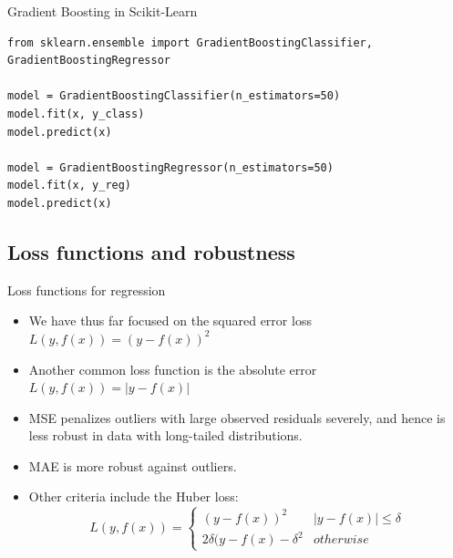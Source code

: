 \documentclass[aspectratio=169]{beamer}
\begin{document}
\begin{frame}[fragile]{Gradient Boosting in Scikit-Learn}
\begin{verbatim}
from sklearn.ensemble import GradientBoostingClassifier, GradientBoostingRegressor

model = GradientBoostingClassifier(n_estimators=50)
model.fit(x, y_class)
model.predict(x)

model = GradientBoostingRegressor(n_estimators=50)
model.fit(x, y_reg)
model.predict(x)

\end{verbatim}
\end{frame}


\subsection{Loss functions and robustness}


\begin{frame}{Loss functions for regression}
    \begin{itemize}
        \item We have thus far focused on the squared error loss $L(y, f(x)) = (y - f(x))^2$
        \item Another common loss function is the absolute error $L(y, f(x)) = |y - f(x)|$
        \item MSE penalizes outliers with large observed residuals severely, and hence is less robust in data with long-tailed distributions.
        \item MAE is more robust against outliers.
        \item Other criteria include the Huber loss:
        \begin{equation*}
            L(y, f(x)) = \left\{ \begin{array}{cc}
                (y - f(x))^2 & |y-f(x)| \leq \delta \\
                2\delta (y-f(x) - \delta^2 & otherwise 
            \end{array}\right.
        \end{equation*}
    \end{itemize}
\end{frame}
\end{document}
